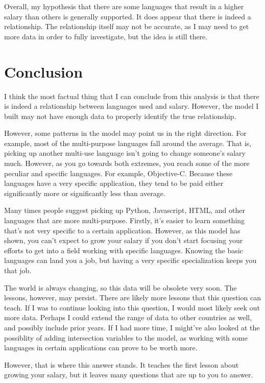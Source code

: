 \documentclass{report}
\begin{document}
Overall, my hypothesis that there are some languages that result in a higher salary than others is generally supported. It does appear that there is indeed a relationship. The relationship itself may not be accurate, as I may need to get more data in order to fully investigate, but the idea is still there.

\chapter{Conclusion}

I think the most factual thing that I can conclude from this analysis is that there is indeed a relationship between languages used and salary. However, the model I built may not have enough data to properly identify the true relationship.

However, some patterns in the model may point us in the right direction. For example, most of the multi-purpose languages fall around the average. That is, picking up another multi-use language isn't going to change someone's salary much. However, as you go towards both extremes, you reach some of the more peculiar and specific languages. For example, Objective-C. Because these languages have a very specific application, they tend to be paid either significantly more or significantly less than average.

Many times people suggest picking up Python, Javascript, HTML, and other languages that are more multi-purpose. Firstly, it's easier to learn something that's not very specific to a certain application. However, as this model has shown, you can't expect to grow your salary if you don't start focusing your efforts to get into a field working with specific languages. Knowing the basic languages can land you a job, but having a very specific specialization keeps you that job.

The world is always changing, so this data will be obsolete very soon. The lessons, however, may persist. There are likely more lessons that this question can teach. If I was to continue looking into this question, I would most likely seek out more data. Perhaps I could extend the range of data to other countries as well, and possibly include prior years. If I had more time, I might've also looked at the possiblity of adding intersection variables to the model, as working with some languages in certain applications can prove to be worth more.

However, that is where this answer stands. It teaches the first lesson about growing your salary, but it leaves many questions that are up to you to answer.
\end{document}
